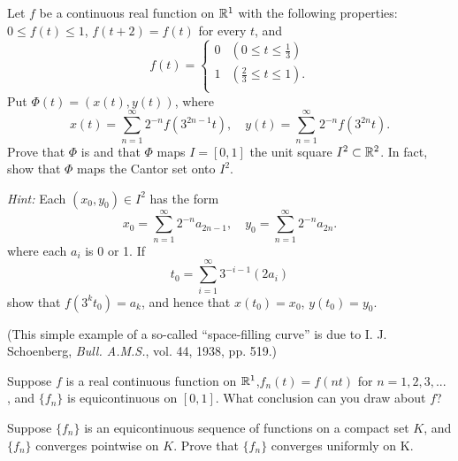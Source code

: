 \begin{myExercise}
    \label{ex:7.14}
    Let $f$ be a continuous real function on ${\protect\mathbb R}^1$ with the following properties:
    $0 \leq f(t) \leq 1$, $f(t + 2) = f(t)$ for every $t$, and
    \begin{equation*}
        f(t) = \left\{ 
            \begin{array}{ll}
                0 & \left( 0 \leq t \leq \frac{1}{3} \right) \\
                1 & \left( \frac{2}{3} \leq t \leq 1 \right) . \\
            \end{array}
         \right.
    \end{equation*}
    Put $\Phi(t) = (x(t), y(t))$, where 
    \begin{equation*}
        x(t) = \sum_{n=1}^{\infty} 2^{-n} f(3^{2n-1} t), \quad 
        y(t) = \sum_{n=1}^{\infty} 2^{-n} f(3^{2n} t).
    \end{equation*}
    Prove that $\Phi$ is  and that $\Phi$ maps $I=[0,1]$  the unit square $I^2 \subset {\protect\mathbb R}^2$.
    In fact, show that $\Phi$ maps the Cantor set onto $I^2$.

    \emph{Hint:} Each $(x_0, y_0) \in I^2$ has the form 
    \begin{equation*}
        x_0 = \sum_{n=1}^{\infty} 2^{-n} a_{2n-1}, \quad 
        y_0 = \sum_{n=1}^{\infty} 2^{-n} a_{2n}.
    \end{equation*}
    where each $a_i$ is 0 or 1. 
    If 
    \begin{equation*}
        t_0 = \sum_{i=1}^{\infty} 3^{-i-1}(2a_i)
    \end{equation*}
    show that $f(3^k t_0) = a_k$, and hence that $x(t_0)=x_0$, $y(t_0)=y_0$.

    (This simple example of a so-called ``space-filling curve'' is due to I. J. Schoenberg, \emph{Bull. A.M.S.}, vol. 44, 1938, pp. 519.)
\end{myExercise}


\begin{myExercise}
    \label{ex:7.15}
    Suppose $f$ is a real continuous function on ${\protect\mathbb R}^1$,$f_n(t) =f(nt)$ for $n =1, 2, 3, ...$ , and
    $\{f_n\}$ is equicontinuous on $[0, 1]$. 
    What conclusion can you draw about $f$?
\end{myExercise}

\begin{myExercise}
    \label{ex:7.16}
    Suppose $\{f_n\}$ is an equicontinuous sequence of functions on a compact set $K$, and $\{f_n\}$ converges pointwise on $K$. 
    Prove that $\{f_n\}$  converges uniformly on K.
\end{myExercise}


